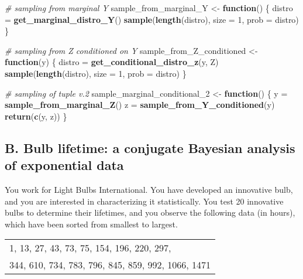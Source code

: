 \documentclass[
]{article}
\newenvironment{Shaded}{\begin{snugshade}}{\end{snugshade}}
\newcommand{\AttributeTok}[1]{\textcolor[rgb]{0.13,0.29,0.53}{#1}}
\newcommand{\CommentTok}[1]{\textcolor[rgb]{0.56,0.35,0.01}{\textit{#1}}}
\newcommand{\ControlFlowTok}[1]{\textcolor[rgb]{0.13,0.29,0.53}{\textbf{#1}}}
\newcommand{\DecValTok}[1]{\textcolor[rgb]{0.00,0.00,0.81}{#1}}
\newcommand{\FunctionTok}[1]{\textcolor[rgb]{0.13,0.29,0.53}{\textbf{#1}}}
\newcommand{\NormalTok}[1]{#1}
\newcommand{\OtherTok}[1]{\textcolor[rgb]{0.56,0.35,0.01}{#1}}
\begin{document}
\begin{Shaded}
\begin{Highlighting}[]
\CommentTok{\# sampling from marginal Y}
\NormalTok{sample\_from\_marginal\_Y }\OtherTok{\textless{}{-}} \ControlFlowTok{function}\NormalTok{() \{}
\NormalTok{    distro }\OtherTok{=} \FunctionTok{get\_marginal\_distro\_Y}\NormalTok{()}
    \FunctionTok{sample}\NormalTok{(}\FunctionTok{length}\NormalTok{(distro), }\AttributeTok{size =} \DecValTok{1}\NormalTok{, }\AttributeTok{prob =}\NormalTok{ distro)}
\NormalTok{\}}

\CommentTok{\# sampling from Z conditioned on Y}
\NormalTok{sample\_from\_Z\_conditioned }\OtherTok{\textless{}{-}} \ControlFlowTok{function}\NormalTok{(y) \{}
\NormalTok{    distro }\OtherTok{=} \FunctionTok{get\_conditional\_distro\_z}\NormalTok{(y, Z)}
    \FunctionTok{sample}\NormalTok{(}\FunctionTok{length}\NormalTok{(distro), }\AttributeTok{size =} \DecValTok{1}\NormalTok{, }\AttributeTok{prob =}\NormalTok{ distro)}
\NormalTok{\}}

\CommentTok{\# sampling of tuple v.2}
\NormalTok{sample\_marginal\_conditional\_2 }\OtherTok{\textless{}{-}} \ControlFlowTok{function}\NormalTok{() \{}
\NormalTok{    y }\OtherTok{=} \FunctionTok{sample\_from\_marginal\_Z}\NormalTok{()}
\NormalTok{    z }\OtherTok{=} \FunctionTok{sample\_from\_Y\_conditioned}\NormalTok{(y)}
    \FunctionTok{return}\NormalTok{(}\FunctionTok{c}\NormalTok{(y, z))}
\NormalTok{\}}
\end{Highlighting}
\end{Shaded}

\bigskip

\newpage

\hypertarget{b.-bulb-lifetime-a-conjugate-bayesian-analysis-of-exponential-data}{%
\subsection{B. Bulb lifetime: a conjugate Bayesian analysis of
exponential
data}\label{b.-bulb-lifetime-a-conjugate-bayesian-analysis-of-exponential-data}}

You work for Light Bulbs International. You have developed an innovative
bulb, and you are interested in characterizing it statistically. You
test 20 innovative bulbs to determine their lifetimes, and you observe
the following data (in hours), which have been sorted from smallest to
largest.

\begin{table}[!h]
\centering
\begin{tabular}{l}
1, 13, 27, 43, 73, 75, 154, 196, 220, 297,\\
344, 610, 734, 783, 796, 845, 859, 992, 1066, 1471
\end{tabular}
\end{table}
\end{document}
